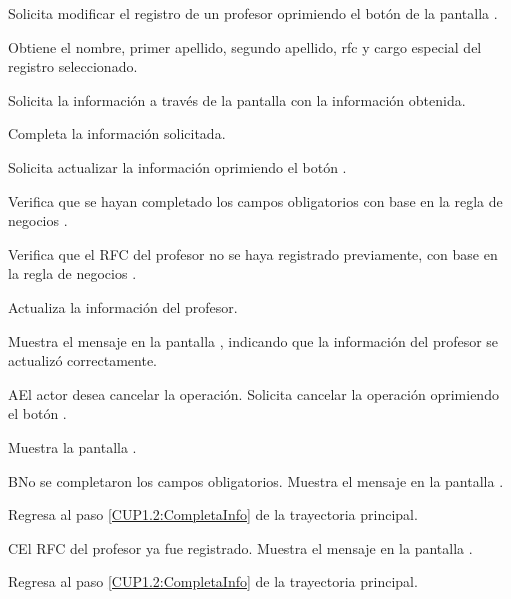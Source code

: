 \begin{UCtrayectoria}
	\UCpaso [\UCactor] Solicita modificar el registro de un profesor oprimiendo el botón  
	de la pantalla . 
	
	\UCpaso [\UCsist] Obtiene el nombre, primer apellido, segundo apellido, rfc y cargo especial del registro seleccionado.
	
	\UCpaso [\UCsist] Solicita la información a través de la pantalla  con la información obtenida.
	
	\UCpaso [\UCactor] Completa la información solicitada. \label{CUP1.2:CompletaInfo}
	
	\UCpaso [\UCactor] Solicita actualizar la información oprimiendo el botón . 
	
	\UCpaso [\UCsist] Verifica que se hayan completado los campos obligatorios con base en la regla de negocios . 
	
	\UCpaso [\UCsist] Verifica que el RFC del profesor no se haya registrado previamente, con base en la regla de negocios . 
	
	\UCpaso [\UCsist] Actualiza la información del profesor.
	
	\UCpaso [\UCsist] Muestra el mensaje  en la pantalla , indicando que la información del profesor se actualizó correctamente.	
\end{UCtrayectoria}


\begin{UCtrayectoriaA}{A}{El actor desea cancelar la operación.}
	\UCpaso [\UCactor] Solicita cancelar la operación oprimiendo el botón .
	
	\UCpaso [\UCsist] Muestra la pantalla . 
\end{UCtrayectoriaA}

\begin{UCtrayectoriaA}{B}{No se completaron los campos obligatorios.}
	\UCpaso [\UCsist] Muestra el mensaje  en la pantalla .
	
	\UCpaso Regresa al paso \ref{CUP1.2:CompletaInfo} de la trayectoria principal.
\end{UCtrayectoriaA}

\begin{UCtrayectoriaA}{C}{El RFC del profesor ya fue registrado.}
	\UCpaso [\UCsist] Muestra el mensaje  en la pantalla .
	
	\UCpaso Regresa al paso \ref{CUP1.2:CompletaInfo} de la trayectoria principal.
\end{UCtrayectoriaA}